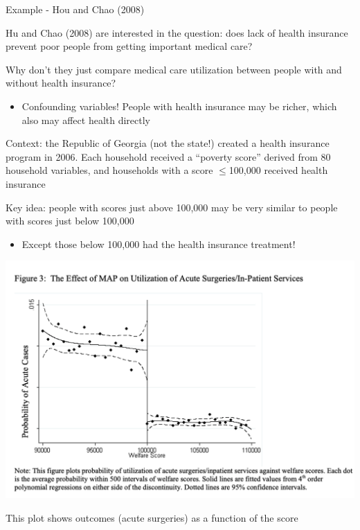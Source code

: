 \documentclass[11pt,english,handout]{beamer}
\newenvironment{wideitemize}{\itemize\addtolength{\itemsep}{10pt}}{\enditemize}
\begin{document}
	\begin{frame}{Example - Hou and Chao (2008)}
		\begin{wideitemize}
			\item
			Hu and Chao (2008) are interested in the question: does lack of health insurance prevent poor people from getting important medical care? 
			
			\pause
			\item
			Why don't they just compare medical care utilization between people with and without health insurance?
			\pause
				\begin{itemize}
					\item 
					Confounding variables! People with health insurance may be richer, which also may affect health directly
				\end{itemize}
			
			\pause
			\item
			Context: the Republic of Georgia (not the state!) created a health insurance program in 2006. Each household received a ``poverty score'' derived from 80 household variables, and households with a score $\leq$100,000 received health insurance
			
			\pause
			\item
			Key idea: people with scores just above 100,000 may be very similar to people with scores just below 100,000\smallskip\pause{}
			\begin{itemize}
			\item Except those below 100,000 had the health insurance treatment!
			\end{itemize}
		\end{wideitemize}
	\end{frame}
	
	\begin{frame}
		\centering
		\includegraphics[width = 0.7\linewidth]{hou-rdd-basic}
		\begin{wideitemize}
			\item
			This plot shows outcomes (acute surgeries) as a function of the score
		\end{wideitemize}	
	\end{frame}
\end{document}
